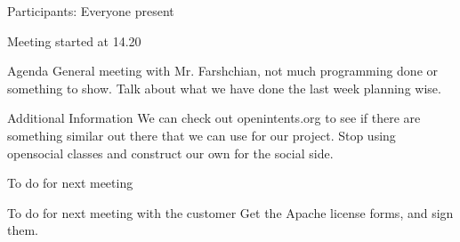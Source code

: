Participants: Everyone present

Meeting started at 14.20

Agenda
General meeting with Mr. Farshchian, not much programming done or something to show. Talk about what we have done the last week planning wise.

Additional Information
We can check out openintents.org to see if there are something similar out there that we can use for our project.
Stop using opensocial classes and construct our own for the social side.

To do for next meeting

To do for next meeting with the customer
Get the Apache license forms, and sign them.